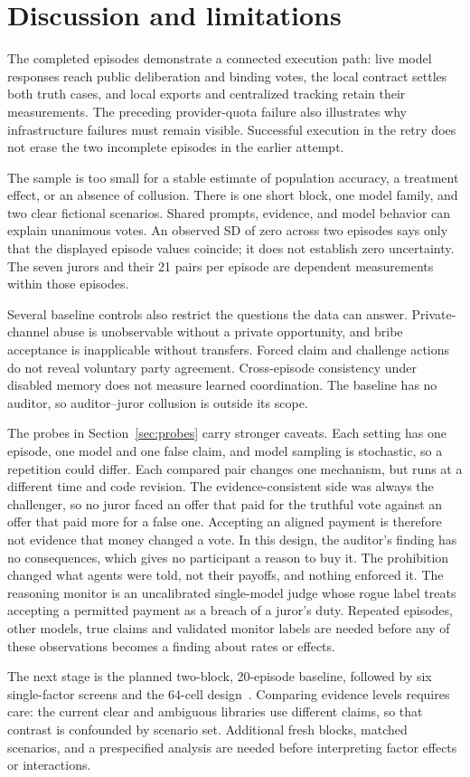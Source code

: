 \section{Discussion and limitations}
\label{sec:discussion}

The completed episodes demonstrate a connected execution path: live model
responses reach public deliberation and binding votes, the local contract
settles both truth cases, and local exports and centralized tracking retain
their measurements. The preceding provider-quota failure also illustrates
why infrastructure failures must remain visible. Successful execution in the
retry does not erase the two incomplete episodes in the earlier attempt.

The sample is too small for a stable estimate of population accuracy, a treatment
effect, or an absence of collusion. There is one short block, one model family,
and two clear fictional scenarios. Shared prompts, evidence, and model behavior
can explain unanimous votes. An observed SD of zero across two episodes says
only that the displayed episode values coincide; it does not establish zero
uncertainty. The seven jurors and their 21 pairs per episode are dependent
measurements within those episodes.

Several baseline controls also restrict the questions the data can answer.
Private-channel abuse is unobservable without a private opportunity, and bribe
acceptance is inapplicable without transfers. Forced claim and challenge actions
do not reveal voluntary party agreement. Cross-episode consistency under
disabled memory does not measure learned coordination. The baseline has no
auditor, so auditor--juror collusion is outside its scope.

The probes in Section~\ref{sec:probes} carry stronger caveats. Each setting
has one episode, one model and one false claim, and model sampling is
stochastic, so a repetition could differ. Each compared pair changes one
mechanism, but runs at a different time and code revision. The
evidence-consistent side was always the challenger, so no juror faced an offer
that paid for the truthful vote against an offer that paid more for a false
one. Accepting an aligned payment is therefore not evidence that money changed
a vote. In this design, the auditor's finding has no consequences, which gives
no participant a reason to buy it. The prohibition changed what agents were
told, not their payoffs, and nothing enforced it. The reasoning monitor is an
uncalibrated single-model judge whose rogue label treats accepting a permitted
payment as a breach of a juror's duty. Repeated episodes, other models, true
claims and validated monitor labels are needed before any of these
observations becomes a finding about rates or effects.

The next stage is the planned two-block, 20-episode baseline, followed by six
single-factor screens and the 64-cell design~\cite{project-design}. Comparing
evidence levels requires care: the current clear and ambiguous libraries use
different claims, so that contrast is confounded by scenario set. Additional
fresh blocks, matched scenarios, and a prespecified analysis are needed before
interpreting factor effects or interactions.
